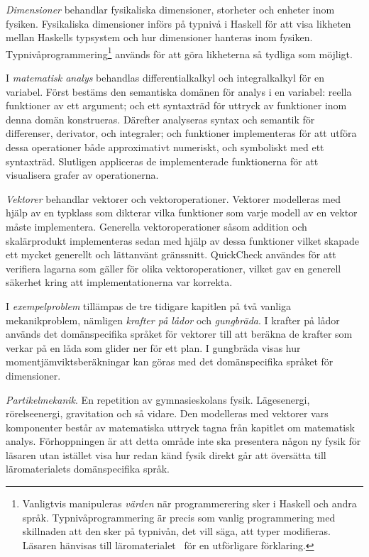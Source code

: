 \textit{Dimensioner} behandlar fysikaliska dimensioner, storheter och enheter inom fysiken.
Fysikaliska dimensioner införs på typnivå i Haskell för att visa likheten mellan
Haskells typsystem och hur dimensioner hanteras inom fysiken.
Typnivåprogrammering\footnote{Vanligtvis manipuleras \textit{värden} när
programmerering sker i Haskell och andra språk. Typnivåprogrammering är precis som
vanlig programmering med skillnaden att den sker på typnivån, det vill säga, att
typer modifieras. Läsaren hänvisas till läromaterialet~\cite{LYAP} för en utförligare
förklaring.} används för att göra likheterna så tydliga som möjligt.

I \textit{matematisk analys} behandlas differentialkalkyl och
integralkalkyl för en variabel. Först bestäms den semantiska domänen
för analys i en variabel: reella funktioner av ett argument; och ett syntaxträd
för uttryck av funktioner inom denna domän konstrueras. Därefter
analyseras syntax och semantik för differenser, derivator, och
integraler; och funktioner implementeras för att utföra dessa
operationer både approximativt numeriskt, och symboliskt med ett
syntaxträd. Slutligen appliceras de implementerade funktionerna för
att visualisera grafer av operationerna.

\textit{Vektorer} behandlar vektorer och vektoroperationer. Vektorer modelleras
med hjälp av en typklass som dikterar vilka funktioner som varje
modell av en vektor måste implementera. Generella vektoroperationer såsom
addition och skalärprodukt implementeras sedan med hjälp av dessa funktioner
vilket skapade ett mycket generellt och lättanvänt gränssnitt. QuickCheck
användes för att verifiera lagarna som gäller för olika vektoroperationer,
vilket gav en generell säkerhet kring att implementationerna var korrekta.

I \textit{exempelproblem} tillämpas de tre tidigare kapitlen på två vanliga
mekanikproblem, nämligen \textit{krafter på lådor} och \textit{gungbräda}. I
krafter på lådor används det domänspecifika språket för vektorer till att
beräkna de krafter som verkar på en låda som glider ner för ett plan. I
gungbräda visas hur momentjämviktsberäkningar kan göras med det domänspecifika
språket för dimensioner. 

\textit{Partikelmekanik}. En repetition av gymnasieskolans fysik.
Lägesenergi, rörelseenergi, gravitation och så vidare. Den modelleras med vektorer vars
komponenter består av matematiska uttryck tagna från kapitlet om matematisk
analys. Förhoppningen är att detta område inte ska presentera någon ny fysik för
läsaren utan istället visa hur redan känd fysik direkt går att översätta till
läromaterialets domänspecifika språk.

